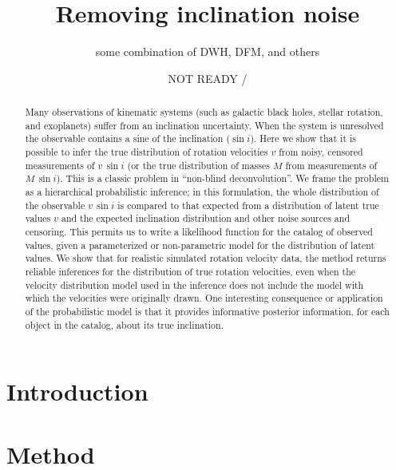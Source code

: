 \documentclass[12pt, preprint]{aastex}
\begin{document}
\title{Removing inclination noise}
\author{some combination of DWH, DFM, and others}
\date{NOT READY / \texttt{\githash}}

\begin{abstract}
Many observations of kinematic systems (such as galactic black holes,
stellar rotation, and exoplanets) suffer from an inclination
uncertainty.
When the system is unresolved the observable contains a sine of the
inclination ($\sin i$).
Here we show that it is possible to infer the true distribution of
rotation velocities $v$ from noisy, censored measurements of $v\,\sin
i$ (or the true distribution of masses $M$ from measurements of
$M\,\sin i$).
This is a classic problem in ``non-blind deconvolution''.
We frame the problem as a hierarchical probabilistic inference; in
this formulation, the whole distribution of the observable $v\,\sin i$
is compared to that expected from a distribution of latent true
values $v$ and the expected inclination distribution and other noise
sources and censoring.
This permits us to write a likelihood function for the catalog of
observed values, given a parameterized or non-parametric model for the
distribution of latent values.
We show that for realistic simulated rotation velocity data, the
method returns reliable inferences for the distribution of true
rotation velocities, even when the velocity distribution model used in
the inference does not include the model with which the velocities
were originally drawn.
One interesting consequence or application of the probabilistic model
is that it provides informative posterior information, for each object
in the catalog, about its true inclination.
\end{abstract}

\section{Introduction}

\section{Method}
\end{document}
